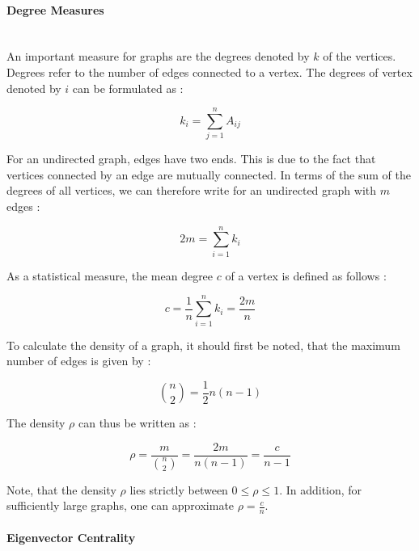 	\paragraph{Degree Measures} \mbox{}\\

	\noindent An important measure for graphs are the degrees denoted by $k$ of 
	the vertices. Degrees refer to the number of edges connected to a vertex. The 
	degrees of vertex denoted by $i$ can be formulated as \citep[p. 133]{Newman2010}:

	\begin{equation}
		k_i = \sum_{j=1}^{n} A_{ij}
	\end{equation}

	\noindent For an undirected graph, edges have two ends. This is due to the 
	fact that vertices connected by an edge are mutually connected. In terms of 
	the sum of the degrees of all vertices, we can therefore write for an
	undirected graph with $m$ edges \citep[p. 133]{Newman2010}:

	\begin{equation}
		2m = \sum_{i=1}^{n} k_i	
	\end{equation}

	\noindent As a statistical measure, the mean degree $c$ of a vertex is 
	defined as follows \citep[p. 134]{Newman2010}:

	\begin{equation}
		c = \frac{1}{n}\sum_{i=1}^{n}k_i = \frac{2m}{n}
	\end{equation}

	\noindent To calculate the density of a graph, it should first be noted, 
	that the maximum number of edges is given by \citep[p. 134]{Newman2010}:

	\begin{equation}
		{n \choose 2} = \frac{1}{2}n(n-1)
	\end{equation}

	\noindent The density $\rho$ can thus be written as \citep[p. 134]{Newman2010}:

	\begin{equation}
		\rho = \frac{m}{{n \choose 2}} = \frac{2m}{n(n-1)} = \frac{c}{n-1}
	\end{equation}

	\noindent Note, that the density $\rho$ lies strictly between 
	$0 \leqslant \rho \leqslant 1$. In addition, for sufficiently large graphs,
	one can approximate $\rho = \frac{c}{n}$. 

	\paragraph{Eigenvector Centrality} \mbox{}\\

